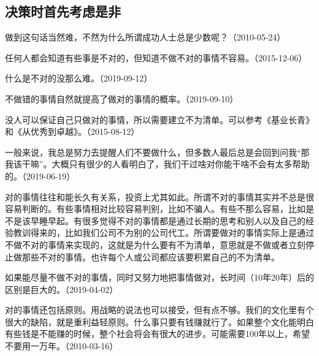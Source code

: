 \subsection{决策时首先考虑是非}


做到这句话当然难，不然为什么所谓成功人士总是少数呢？（2010-05-24）


任何人都会知道有些事是不对的，但知道不做不对的事情不容易。（2015-12-06）


什么是不对的没那么难。（2019-09-12）


不做错的事情自然就提高了做对的事情的概率。（2019-09-10）


没人可以保证自己只做对的事情，所以需要建立不为清单。可以参考《基业长青》和《从优秀到卓越》。（2015-08-12）

一般来说，我总是努力去提醒人们不要做什么，但多数人最后总是会回到问我“那我该干嘛”。大概只有很少的人看明白了，我们干过啥对你能干啥不会有太多帮助的。（2019-06-19）

对的事情往往和能长久有关系，投资上尤其如此。所谓不对的事情其实并不总是很容易判断的。有些事情相对比较容易判别，比如不骗人。有些不那么容易，比如是不是该早睡早起。有很多觉得不对的事情都是通过长期的思考和别人以及自己的经验教训得来的，比如我们公司不为别的公司代工。所谓要做对的事情实际上是通过不做不对的事情来实现的，这就是为什么要有不为清单，意思就是不做或者立刻停止做那些不对的事情。也许每个人或公司都应该要积累自己的不为清单。

如果能尽量不做不对的事情，同时又努力地把事情做对，长时间（10年20年）后的区别是巨大的。（2019-04-02）


对的事情还包括原则。用战略的说法也可以接受，但有点不够。我们的文化里有个很大的缺陷，就是重利益轻原则。什么事只要有钱赚就行了。如果整个文化能明白有些钱是不能赚的时候，整个社会将会有很大的进步。可能需要100年以上，希望不要用一万年。（2010-03-16）


